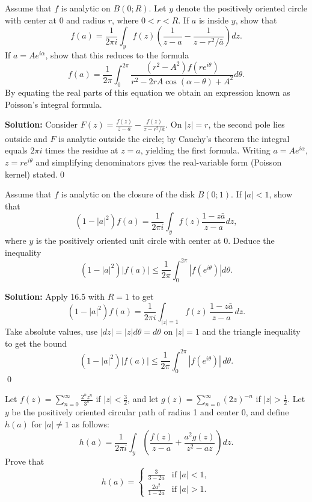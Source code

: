 \begin{problembox}
Assume that \( f \) is analytic on \( B(0; R) \). Let \( y \) denote the positively oriented circle with center at 0 and radius \( r \), where \( 0 < r < R \). If \( a \) is inside \( y \), show that
\[f(a) = \frac{1}{2\pi i} \int_{y} f(z) \left( \frac{1}{z - a} - \frac{1}{z - r^2 / \bar{a}} \right) dz.\]
If \( a = Ae^{i\alpha} \), show that this reduces to the formula
\[f(a) = \frac{1}{2\pi} \int_0^{2\pi} \frac{(r^2 - A^2)f(re^{i\theta})}{r^2 - 2rA \cos (\alpha - \theta) + A^2} d\theta.\]
By equating the real parts of this equation we obtain an expression known as Poisson's integral formula.
\end{problembox}

\noindent\textbf{Solution:}
Consider $F(z)=\frac{f(z)}{z-a}-\frac{f(z)}{z-r^2/\bar a}$. On $|z|=r$, the second pole lies outside and $F$ is analytic outside the circle; by Cauchy's theorem the integral equals $2\pi i$ times the residue at $z=a$, yielding the first formula. Writing $a=Ae^{i\alpha}$, $z=re^{i\theta}$ and simplifying denominators gives the real-variable form (Poisson kernel) stated.\qed


\begin{problembox}
Assume that \( f \) is analytic on the closure of the disk \( B(0; 1) \). If \( |a| < 1 \), show that
\[(1 - |a|^2)f(a) = \frac{1}{2\pi i} \int_{y} f(z) \frac{1 - z\bar{a}}{z - a} dz,\]
where \( y \) is the positively oriented unit circle with center at 0. Deduce the inequality
\[(1 - |a|^2) |f(a)| \leq \frac{1}{2\pi} \int_0^{2\pi} |f(e^{i\theta})| d\theta.\]
\end{problembox}

\noindent\textbf{Solution:}
Apply 16.5 with $R=1$ to get
\[(1-|a|^2)f(a)=\frac{1}{2\pi i}\int_{|z|=1} f(z)\,\frac{1-z\bar a}{z-a}\,dz.\]
Take absolute values, use $|dz|=|z|d\theta=d\theta$ on $|z|=1$ and the triangle inequality to get the bound
\[(1-|a|^2)|f(a)|\le \frac{1}{2\pi}\int_0^{2\pi}|f(e^{i\theta})|\,d\theta.\]\qed


\begin{problembox}
Let \( f(z) = \sum_{n=0}^{\infty} \frac{2^n z^n}{3^n} \) if \( |z| < \frac{3}{2} \), and let \( g(z) = \sum_{n=0}^{\infty} (2z)^{-n} \) if \( |z| > \frac{1}{2} \). Let \( y \) be the positively oriented circular path of radius 1 and center 0, and define \( h(a) \) for \( |a| \neq 1 \) as follows:
\[h(a) = \frac{1}{2\pi i} \int_y \left( \frac{f(z)}{z - a} + \frac{a^2 g(z)}{z^2 - az} \right) dz.\]
Prove that
\[h(a) = \begin{cases} 
\frac{3}{3 - 2a} & \text{if } |a| < 1, \\ 
\frac{2a^2}{1 - 2a} & \text{if } |a| > 1.
\end{cases}\]
\end{problembox}

